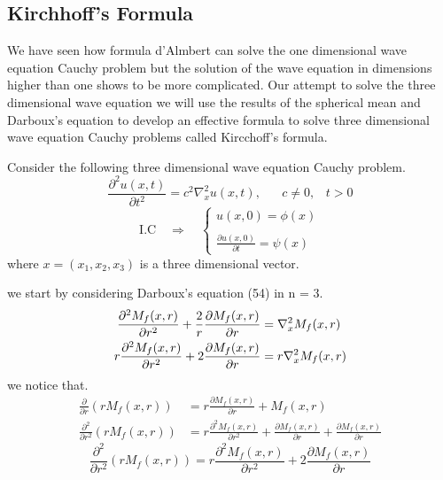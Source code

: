 \documentclass[]{article}
\begin{document}
\subsection{Kirchhoff's Formula}
We have seen how formula d'Almbert can solve the one dimensional wave equation Cauchy problem but the solution of the wave equation in dimensions higher than one shows to be more complicated. 
Our attempt to solve the three dimensional wave equation 
we will use the results of the spherical mean and Darboux's equation to develop an effective formula to solve three dimensional wave equation Cauchy problems called Kircchoff's formula.
\par
Consider the following three dimensional wave equation Cauchy problem.
\begin{equation}
\frac{\partial^2 u(x,t)}{\partial t^2} = c^2 \nabla_{x}^{2}u(x,t), \;\;\;\;\;\; c\neq 0 ,\;\;\; t > 0
\end{equation}
\begin{equation}
    \text{I.C} \quad \Longrightarrow \quad 
    \begin{cases}
    u\left(x,0 \right) = \phi\left(x\right)
    \\
    \\
    \displaystyle \frac{\partial u\left(x,0 \right)}{\partial t} = \psi\left(x\right)
    \end{cases}
\end{equation}
where $x = (x_1,x_2,x_3)$ is a three dimensional vector.
\par
we start by considering Darboux's equation (54) in n = 3.
\begin{align}
\frac{\partial^2 M_f (x,r)}{\partial r^2} + \frac{2}{r} \frac{\partial M_f (x,r)}{\partial r} &= \nabla_{x}^{2} M_f (x,r) \notag
\\ 
r\frac{\partial^2 M_f (x,r)}{\partial r^2} + 2 \frac{\partial M_f (x,r)}{\partial r} &= r\nabla_{x}^{2} M_f (x,r)
\end{align}
we notice that.
\begin{align*}
\frac{\partial }{\partial r}\left(rM_f (x,r) \right) &= r\frac{\partial M_f(x,r)}{\partial r} +M_f (x,r)
\\
\frac{\partial^2 }{\partial r^2}\left(rM_f (x,r) \right) &= r\frac{\partial^2 M_f(x,r)}{\partial r^2} + \frac{\partial M_f(x,r)}{\partial r}  + \frac{\partial M_f(x,r)}{\partial r}
\end{align*}
\begin{equation}
\frac{\partial^2 }{\partial r^2}\left(rM_f (x,r) \right) = r\frac{\partial^2 M_f(x,r)}{\partial r^2} + 2\frac{\partial M_f(x,r)}{\partial r}
\end{equation}
\end{document}
